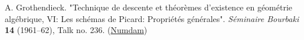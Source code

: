 
A. Grothendieck.
"Technique de descente et théorèmes d'existence en géométrie algébrique, VI: Les schémas de Picard: Propriétés générales".
\emph{Séminaire Bourbaki} \textbf{14} (1961–62), Talk no. 236.
(\href{http://www.numdam.org/book-part/SB_1961-1962__7__221_0/}{Numdam})